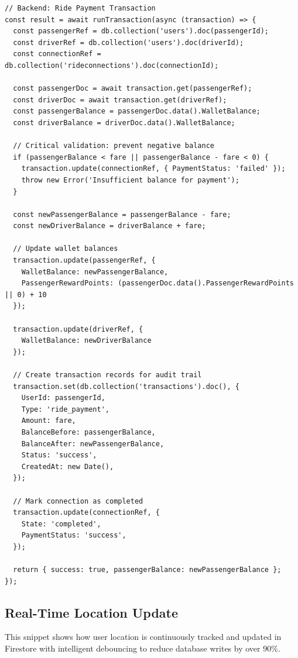 \documentclass[10pt,a4paper]{report}
\begin{document}
\begin{verbatim}
// Backend: Ride Payment Transaction
const result = await runTransaction(async (transaction) => {
  const passengerRef = db.collection('users').doc(passengerId);
  const driverRef = db.collection('users').doc(driverId);
  const connectionRef = db.collection('rideconnections').doc(connectionId);

  const passengerDoc = await transaction.get(passengerRef);
  const driverDoc = await transaction.get(driverRef);
  const passengerBalance = passengerDoc.data().WalletBalance;
  const driverBalance = driverDoc.data().WalletBalance;

  // Critical validation: prevent negative balance
  if (passengerBalance < fare || passengerBalance - fare < 0) {
    transaction.update(connectionRef, { PaymentStatus: 'failed' });
    throw new Error('Insufficient balance for payment');
  }

  const newPassengerBalance = passengerBalance - fare;
  const newDriverBalance = driverBalance + fare;

  // Update wallet balances
  transaction.update(passengerRef, { 
    WalletBalance: newPassengerBalance,
    PassengerRewardPoints: (passengerDoc.data().PassengerRewardPoints || 0) + 10
  });
  
  transaction.update(driverRef, {
    WalletBalance: newDriverBalance
  });

  // Create transaction records for audit trail
  transaction.set(db.collection('transactions').doc(), {
    UserId: passengerId,
    Type: 'ride_payment',
    Amount: fare,
    BalanceBefore: passengerBalance,
    BalanceAfter: newPassengerBalance,
    Status: 'success',
    CreatedAt: new Date(),
  });

  // Mark connection as completed
  transaction.update(connectionRef, {
    State: 'completed',
    PaymentStatus: 'success',
  });

  return { success: true, passengerBalance: newPassengerBalance };
});
\end{verbatim}

\subsection{Real-Time Location Update}

\justify\large This snippet shows how user location is continuously tracked and updated in Firestore with intelligent debouncing to reduce database writes by over 90\%.
\end{document}
